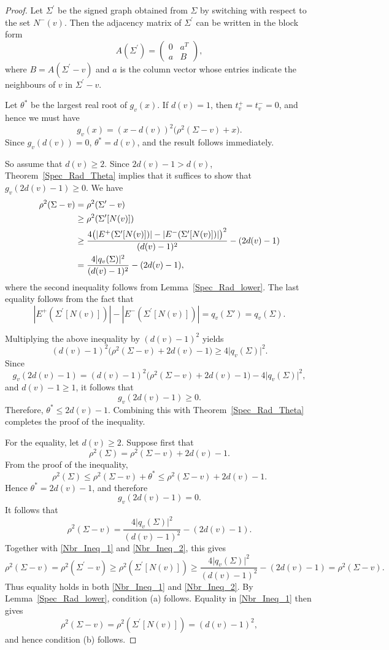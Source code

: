 \documentclass[10pt,a4paper]{amsart}
\begin{document}
	\begin{proof}
		Let $\Sigma^\prime$ be the signed graph obtained from $\Sigma$ by switching with respect to the set $N^-(v)$. Then the adjacency matrix of $\Sigma^\prime$ can be written in the block form
		\[
		A(\Sigma^\prime)=
		\begin{pmatrix}
			0 & a^T\\
			a & B
		\end{pmatrix},
		\]
		where $B=A(\Sigma^\prime-v)$ and $a$ is the column vector whose entries indicate the neighbours of $v$ in $\Sigma^\prime-v$.
		
		Let $\theta^*$ be the largest real root of $g_v(x)$.
		If $d(v)=1$, then $t_v^+=t_v^-=0$, and hence we must have
		\[
		g_v(x)=(x-d(v))^2\bigl(\rho^{2}(\Sigma-v)+x\bigr).
		\]
		Since $g_v(d(v))=0$, $\theta^*=d(v)$, and the result follows immediately.
		
		So assume that $d(v)\ge 2$. Since $2d(v)-1>d(v)$, Theorem~\ref{Spec_Rad_Theta} implies that it suffices to show that $g_v(2d(v)-1)\ge 0.$
		We have
		\begin{align}
			\rho^2(\Sigma-v)
			&=\rho^2(\Sigma^\prime-v) \notag\\
			&\ge \rho^2(\Sigma^\prime[N(v)]) \label{Nbr_Ineq_1} \\
			&\ge
			\frac{4\bigl(|E^{+}(\Sigma^\prime[N(v)])|-|E^{-}(\Sigma^\prime[N(v)])|\bigr)^2}
			{(d(v)-1)^2}
			-(2d(v)-1) \label{Nbr_Ineq_2}\\
			&=
			\frac{4\vert q_v(\Sigma)\vert^2}{(d(v)-1)^2}
			-(2d(v)-1)\notag,
		\end{align}
		where the second inequality follows from Lemma~\ref{Spec_Rad_lower}. The last equality follows from the fact that 
		\[
		|E^{+}(\Sigma^\prime[N(v)])|-|E^{-}(\Sigma^\prime[N(v)])|
		= q_v(\Sigma')=q_v(\Sigma).
		\]
		
		Multiplying the above inequality by $(d(v)-1)^2$ yields
		\[
		(d(v)-1)^2\bigl(\rho^2(\Sigma-v)+2d(v)-1\bigr)
		\ge 4\vert q_v(\Sigma)\vert^2.
		\]
		Since
		\[
		g_v(2d(v)-1)
		=(d(v)-1)^2\bigl(\rho^2(\Sigma-v)+2d(v)-1\bigr)
		-4\vert q_v(\Sigma) \vert^2,
		\]
		and $d(v)-1\ge 1$, it follows that
		\[g_v(2d(v)-1)\ge 0.\]
		Therefore, $\theta^*\le 2d(v)-1$. Combining this with Theorem~\ref{Spec_Rad_Theta} completes the proof of the inequality. 
		
		For the equality, let $d(v) \geq 2$. Suppose first that
		\[ \rho^2(\Sigma)=\rho^2(\Sigma-v)+2d(v)-1. \]
		From the proof of the inequality,
		\[ \rho^2(\Sigma) \leq \rho^2(\Sigma-v)+\theta^* \leq \rho^2(\Sigma-v)+2d(v)-1. \]
		Hence $\theta^*=2d(v)-1$, and therefore
		\[ g_v(2d(v)-1)=0. \]
		It follows that
		\[ \rho^2(\Sigma-v) = \frac{4\vert q_v(\Sigma)\vert^2}{(d(v)-1)^2} -(2d(v)-1).\]
		Together with \eqref{Nbr_Ineq_1} and \eqref{Nbr_Ineq_2}, this gives
		\[ \rho^2(\Sigma-v) =\rho^2(\Sigma^\prime-v) \geq \rho^2(\Sigma^\prime[N(v)])
		\geq \frac{4\vert q_v(\Sigma)\vert^2}{(d(v)-1)^2} -(2d(v)-1) =\rho^2(\Sigma-v).\]
		Thus equality holds in both \eqref{Nbr_Ineq_1} and \eqref{Nbr_Ineq_2}. By Lemma~\ref{Spec_Rad_lower}, condition (a) follows. Equality in \eqref{Nbr_Ineq_1} then gives
		\[ \rho^2(\Sigma-v) =\rho^2(\Sigma^\prime[N(v)]) =(d(v)-1)^2, \]
		and hence condition (b) follows.
		

\end{proof}
\end{document}
